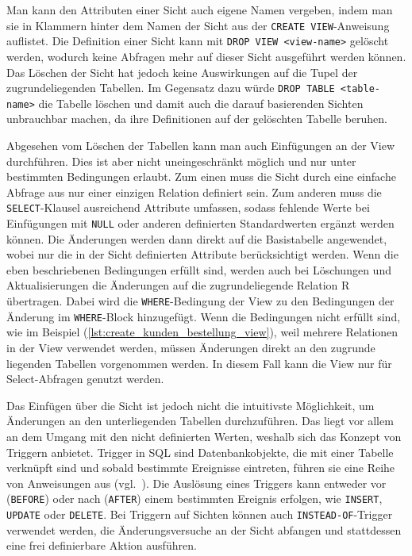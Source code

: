 

Man kann den Attributen einer Sicht auch eigene Namen vergeben, indem man sie in Klammern hinter dem Namen der Sicht aus der \texttt{CREATE VIEW}-Anweisung auflistet.
Die Definition einer Sicht kann mit \texttt{DROP VIEW <view-name>} gelöscht werden, wodurch keine Abfragen mehr auf dieser Sicht ausgeführt werden können.
Das Löschen der Sicht hat jedoch keine Auswirkungen auf die Tupel der zugrundeliegenden Tabellen.
Im Gegensatz dazu würde \texttt{DROP TABLE <table-name>} die Tabelle löschen und damit auch die darauf basierenden Sichten unbrauchbar machen, da ihre Definitionen auf der gelöschten Tabelle beruhen.

Abgesehen vom Löschen der Tabellen kann man auch Einfügungen an der View durchführen.
Dies ist aber nicht uneingeschränkt möglich und nur unter bestimmten Bedingungen erlaubt.
Zum einen muss die Sicht durch eine einfache Abfrage aus nur einer einzigen Relation definiert sein.
Zum anderen muss die \texttt{SELECT}-Klausel ausreichend Attribute umfassen, sodass fehlende Werte bei Einfügungen mit \texttt{NULL} oder anderen definierten Standardwerten ergänzt werden können.
Die Änderungen werden dann direkt auf die Basistabelle angewendet, wobei nur die in der Sicht definierten Attribute berücksichtigt werden.
Wenn die eben beschriebenen Bedingungen erfüllt sind, werden auch bei Löschungen und Aktualisierungen die Änderungen auf die zugrundeliegende Relation R übertragen.
Dabei wird die \texttt{WHERE}-Bedingung der View zu den Bedingungen der Änderung im \texttt{WHERE}-Block hinzugefügt.
Wenn die Bedingungen nicht erfüllt sind, wie im Beispiel (\ref{lst:create_kunden_bestellung_view}), weil mehrere Relationen in der View verwendet werden, müssen Änderungen direkt an den zugrunde liegenden Tabellen vorgenommen werden.
In diesem Fall kann die View nur für Select-Abfragen genutzt werden.

Das Einfügen über die Sicht ist jedoch nicht die intuitivste Möglichkeit, um Änderungen an den unterliegenden Tabellen durchzuführen.
Das liegt vor allem an dem Umgang mit den nicht definierten Werten, weshalb sich das Konzept von Triggern anbietet.
Trigger in SQL sind Datenbankobjekte, die mit einer Tabelle verknüpft sind und sobald bestimmte Ereignisse eintreten, führen sie eine Reihe von Anweisungen aus (vgl.\ \cite[S. 180]{silberschatz2011database}).
Die Auslösung eines Triggers kann entweder vor (\texttt{BEFORE}) oder nach (\texttt{AFTER}) einem bestimmten Ereignis erfolgen, wie \texttt{INSERT}, \texttt{UPDATE} oder \texttt{DELETE}.
Bei Triggern auf Sichten können auch \texttt{INSTEAD-OF}-Trigger verwendet werden, die Änderungsversuche an der Sicht abfangen und stattdessen eine frei definierbare Aktion ausführen.


